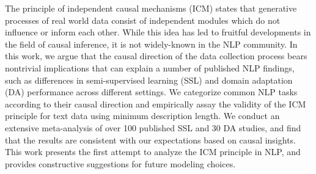 The principle of independent causal mechanisms (ICM) states that generative processes of real world data consist of independent modules which do not influence or inform each other. While this idea has led to fruitful developments in the field of causal inference, it is not widely-known in the NLP community. In this work, we argue that the causal direction of the data collection process bears nontrivial implications that can explain a number of published NLP findings, such as differences in semi-supervised learning (SSL) and domain adaptation (DA) performance across different settings. We categorize common NLP tasks according to their causal direction and empirically assay the validity of the ICM principle for text data using minimum description length. We conduct an extensive meta-analysis of over 100 published SSL and 30 DA studies, and find that the results are consistent with our expectations based on causal insights. This work presents the first attempt to analyze the ICM principle in NLP, and provides constructive suggestions for future modeling choices.
